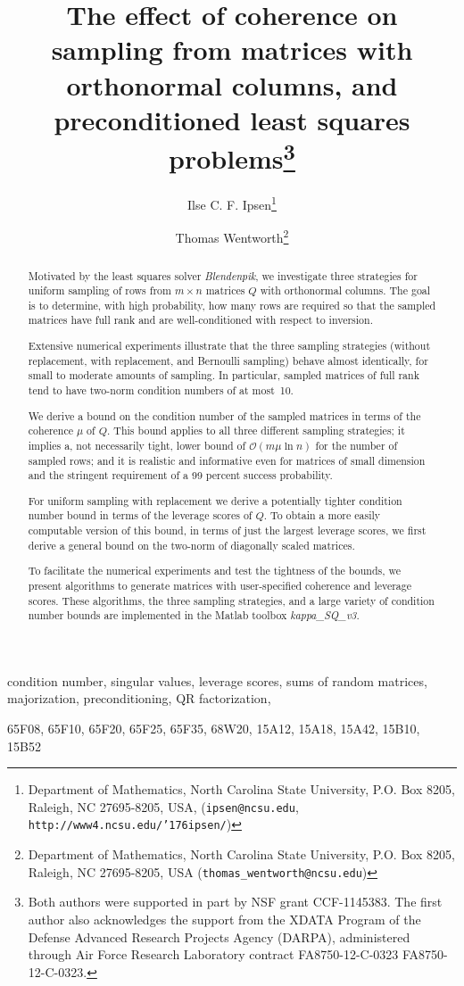 \documentclass{siamltex}
\title{The effect of coherence on sampling from matrices with orthonormal 
columns, and preconditioned least squares problems\thanks{Both authors were
supported in part by NSF grant CCF-1145383. The first author also
acknowledges the support from the XDATA Program of the Defense Advanced
Research Projects Agency (DARPA), administered through Air Force
Research Laboratory contract FA8750-12-C-0323 FA8750-12-C-0323.
}
}
\author{Ilse C. F. Ipsen\thanks{Department of Mathematics, North Carolina State University, P.O. Box 8205,
Raleigh, NC 27695-8205, USA, (\texttt{ipsen@ncsu.edu}, 
\texttt{http://www4.ncsu.edu/{\char'176}ipsen/})}
\and
Thomas Wentworth\thanks{Department of Mathematics, North Carolina State University, P.O. Box 8205,
Raleigh, NC 27695-8205, USA (\texttt{thomas\_wentworth@ncsu.edu})}
}
\begin{document}
\maketitle

\begin{abstract} 
Motivated by the least squares solver \textsl{Blendenpik}, we
investigate three strategies for uniform sampling of rows from
$m\times n$ matrices $Q$ with orthonormal columns. The goal is to
determine, with high probability, how many rows are required so that
the sampled matrices have full rank and are well-conditioned with
respect to inversion.

Extensive numerical experiments illustrate that the three sampling
strategies (without replacement, with replacement, and Bernoulli
sampling) behave almost identically, 
for small to moderate amounts of sampling.
In particular, sampled matrices of full rank tend to have
two-norm condition numbers of at most~10.

We derive a bound on the condition number of the sampled matrices
in terms of the coherence $\mu$ of $Q$. This bound
applies to all three different sampling strategies; it
implies a, not necessarily tight, lower bound of
$\mathcal{O}\left(m\mu\ln{n}\right)$ for the number of sampled rows;
and it is realistic and informative 
even for matrices of small dimension
and the stringent requirement of a 99 percent success probability.

For uniform sampling with replacement we derive a potentially tighter
condition number bound in terms of the leverage scores of $Q$. To obtain
a more easily computable version of this bound, in terms of just the largest
leverage scores, we first derive a general bound on the two-norm of 
diagonally scaled matrices.

To facilitate the numerical experiments and test the tightness of the bounds,
we present algorithms to generate matrices with user-specified 
coherence and leverage scores. These algorithms, the three sampling strategies,
and a large variety of condition number bounds are implemented
in the Matlab toolbox \textsl{kappa\_SQ\_v3}.
\end{abstract}

\begin{keywords} 
condition number,  singular values, leverage scores,
sums of random matrices, majorization, preconditioning, QR factorization,
\end{keywords}

\begin{AM} 
65F08, 65F10, 65F20, 65F25, 65F35, 68W20, 15A12, 15A18, 15A42, 15B10, 15B52
\end{AM}
\end{document}
